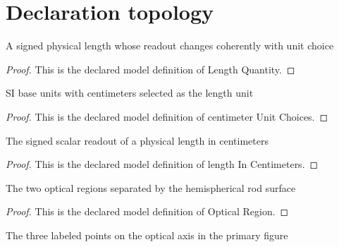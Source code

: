 \section{Declaration topology}
\begin{definition}
  \label{def:physics:phyx-mini-0054:phyxminiproblems-problemphyxmini0054-lengthquantity}
  A signed physical length whose readout changes coherently with unit choice
\end{definition}
\begin{proof}
  This is the declared model definition of Length Quantity.
\end{proof}
\begin{definition}
  \label{def:physics:phyx-mini-0054:phyxminiproblems-problemphyxmini0054-centimeterunitchoices}
  SI base units with centimeters selected as the length unit
\end{definition}
\begin{proof}
  This is the declared model definition of centimeter Unit Choices.
\end{proof}
\begin{definition}
  \label{def:physics:phyx-mini-0054:phyxminiproblems-problemphyxmini0054-lengthincentimeters}
  The signed scalar readout of a physical length in centimeters
\end{definition}
\begin{proof}
  This is the declared model definition of length In Centimeters.
\end{proof}
\begin{definition}
  \label{def:physics:phyx-mini-0054:phyxminiproblems-problemphyxmini0054-opticalregion}
  The two optical regions separated by the hemispherical rod surface
\end{definition}
\begin{proof}
  This is the declared model definition of Optical Region.
\end{proof}
\begin{definition}
  \label{def:physics:phyx-mini-0054:phyxminiproblems-problemphyxmini0054-figurepoint}
  The three labeled points on the optical axis in the primary figure
\end{definition}
